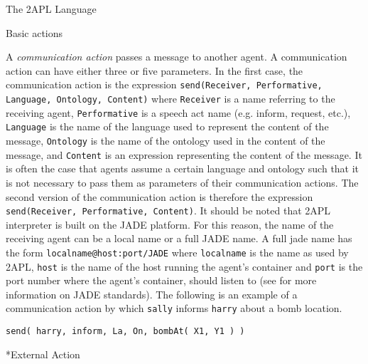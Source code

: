 \begin{chapter}{The 2APL Language}
\begin{section}{Basic actions}
\begin{subsection}
A \emph{communication action} passes a message to another agent. A
communication action  can have either three or five
parameters. In the first case, the communication action is the
expression {\tt send(Receiver, Performative, Language, Ontology,
Content)} where {\tt Receiver} is a name referring to the receiving
agent, {\tt Performative} is a speech act name (e.g. inform,
request, etc.), {\tt Language} is the name of the language used to
represent the content of the message, {\tt Ontology} is the name of
the ontology used in the content of the message, and {\tt Content}
is an expression representing the content of the message. It is
often the case that agents assume a certain language and ontology
such that it is not necessary to pass them as parameters of their
communication actions. The second version of the communication
action is therefore the expression {\tt send(Receiver, Performative,
Content)}. It should be noted that 2APL interpreter is built on the
JADE platform. For this reason, the name of the receiving agent can
be a local name or a full JADE name. A full jade name has the form
{\tt localname@host:port/JADE} where {\tt localname} is the name as
used by 2APL, {\tt host} is the name of the host running the agent's
container and {\tt port} is the port number where the agent's
container, should listen to (see \cite{jade2005} for more
information on JADE standards). The following is an example of a
communication action by which {\tt sally} informs {\tt harry} about
a bomb location.

\begin{verbatim}
send( harry, inform, La, On, bombAt( X1, Y1 ) )
\end{verbatim}

\end{subsection}


\begin{subsection}*{External Action}\label{sec:externalaction}


\end{subsection}
\end{section}
\end{chapter}
